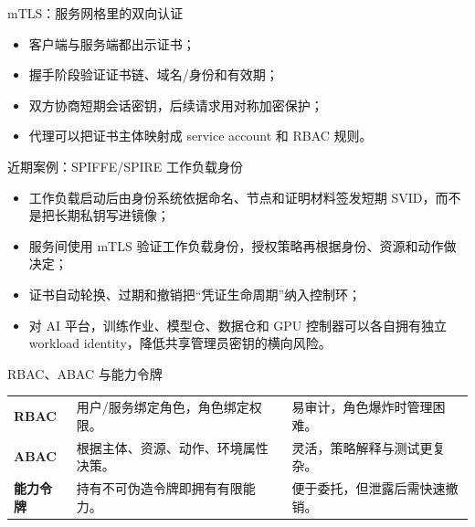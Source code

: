 \documentclass[UTF8,fontset=none,aspectratio=169,10pt]{beamer}
\begin{document}
\begin{frame}{mTLS：服务网格里的双向认证}
\begin{itemize}
  \item 客户端与服务端都出示证书；
  \item 握手阶段验证证书链、域名/身份和有效期；
  \item 双方协商短期会话密钥，后续请求用对称加密保护；
  \item 代理可以把证书主体映射成 service account 和 RBAC 规则。
\end{itemize}
\end{frame}

\begin{frame}{近期案例：SPIFFE/SPIRE 工作负载身份}
\begin{itemize}
  \item 工作负载启动后由身份系统依据命名、节点和证明材料签发短期 SVID，而不是把长期私钥写进镜像；
  \item 服务间使用 mTLS 验证工作负载身份，授权策略再根据身份、资源和动作做决定；
  \item 证书自动轮换、过期和撤销把“凭证生命周期”纳入控制环；
  \item 对 AI 平台，训练作业、模型仓、数据仓和 GPU 控制器可以各自拥有独立 workload identity，降低共享管理员密钥的横向风险。
\end{itemize}
\vfill
{}
\end{frame}


\begin{frame}{RBAC、ABAC 与能力令牌}
\begin{tabularx}{\linewidth}{>{\bfseries}p{3cm}XX}
\toprule
RBAC & 用户/服务绑定角色，角色绑定权限。 & 易审计，角色爆炸时管理困难。 \\
ABAC & 根据主体、资源、动作、环境属性决策。 & 灵活，策略解释与测试更复杂。 \\
能力令牌 & 持有不可伪造令牌即拥有有限能力。 & 便于委托，但泄露后需快速撤销。 \\
\bottomrule
\end{tabularx}
\vfill
{}
\end{frame}
\end{document}
